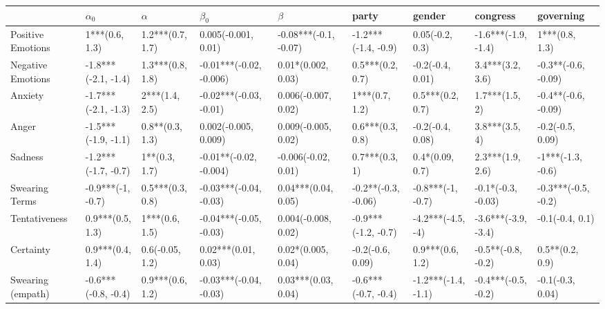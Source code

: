 \begin{tabular}{lllllllll}
\toprule
{} &           $\alpha_0$ &           $\alpha$ &                $\beta_0$ &                 $\beta$ &                party &               gender &             congress &            governing \\
\midrule
Positive Emotions     &       1***(0.6, 1.3) &   1.2***(0.7, 1.7) &      0.005(-0.001, 0.01) &   -0.08***(-0.1, -0.07) &  -1.2***(-1.4, -0.9) &      0.05(-0.2, 0.3) &  -1.6***(-1.9, -1.4) &       1***(0.8, 1.3) \\
Negative Emotions     &  -1.8***(-2.1, -1.4) &   1.3***(0.8, 1.8) &  -0.01***(-0.02, -0.006) &      0.01*(0.002, 0.03) &     0.5***(0.2, 0.7) &     -0.2(-0.4, 0.01) &     3.4***(3.2, 3.6) &  -0.3**(-0.6, -0.09) \\
Anxiety               &  -1.7***(-2.1, -1.3) &     2***(1.4, 2.5) &   -0.02***(-0.03, -0.01) &     0.006(-0.007, 0.02) &       1***(0.7, 1.2) &     0.5***(0.2, 0.7) &       1.7***(1.5, 2) &  -0.4**(-0.6, -0.09) \\
Anger                 &  -1.5***(-1.9, -1.1) &    0.8**(0.3, 1.3) &     0.002(-0.005, 0.009) &     0.009(-0.005, 0.02) &     0.6***(0.3, 0.8) &     -0.2(-0.4, 0.08) &       3.8***(3.5, 4) &     -0.2(-0.5, 0.09) \\
Sadness               &  -1.2***(-1.7, -0.7) &      1**(0.3, 1.7) &   -0.01**(-0.02, -0.004) &     -0.006(-0.02, 0.01) &       0.7***(0.3, 1) &      0.4*(0.09, 0.7) &     2.3***(1.9, 2.6) &    -1***(-1.3, -0.6) \\
Swearing Terms        &    -0.9***(-1, -0.7) &   0.5***(0.3, 0.8) &   -0.03***(-0.04, -0.03) &     0.04***(0.04, 0.05) &  -0.2**(-0.3, -0.06) &    -0.8***(-1, -0.7) &   -0.1*(-0.3, -0.03) &  -0.3***(-0.5, -0.2) \\
Tentativeness         &     0.9***(0.5, 1.3) &     1***(0.6, 1.5) &   -0.04***(-0.05, -0.03) &     0.004(-0.008, 0.02) &  -0.9***(-1.2, -0.7) &    -4.2***(-4.5, -4) &  -3.6***(-3.9, -3.4) &      -0.1(-0.4, 0.1) \\
Certainty             &     0.9***(0.4, 1.4) &    0.6(-0.05, 1.2) &      0.02***(0.01, 0.03) &      0.02*(0.005, 0.04) &     -0.2(-0.6, 0.09) &     0.9***(0.6, 1.2) &   -0.5**(-0.8, -0.2) &      0.5**(0.2, 0.9) \\
Swearing (empath)     &  -0.6***(-0.8, -0.4) &   0.9***(0.6, 1.2) &   -0.03***(-0.04, -0.03) &     0.03***(0.03, 0.04) &  -0.6***(-0.7, -0.4) &  -1.2***(-1.4, -1.1) &  -0.4***(-0.5, -0.2) &     -0.1(-0.3, 0.04) \\

\end{tabular}

